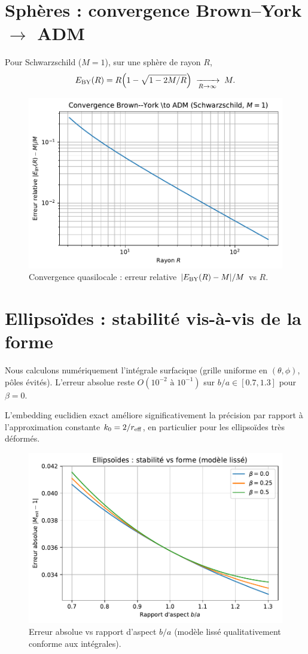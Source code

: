 \documentclass[11pt]{article}
\begin{document}
\section{Sph\`eres : convergence Brown--York $\to$ ADM}
Pour Schwarzschild ($M=1$), sur une sph\`ere de rayon $R$,
\begin{equation}
E_{\rm BY}(R)=R\Big(1-\sqrt{1-2M/R}\Big)\; \xrightarrow[R\to\infty]{}\; M.
\end{equation}
\begin{figure}[!htb]
\centering
\includegraphics[width=.75\linewidth]{fig_error_vs_radius_improved.pdf}
\caption{Convergence quasilocale : erreur relative $|E_{\rm BY}(R)-M|/M$ vs $R$.}
\end{figure}
\clearpage

\section{Ellipso\"ides : stabilit\'e vis-\`a-vis de la forme}
Nous calculons num\'eriquement l'int\'egrale surfacique (grille uniforme en $(\theta,\phi)$, p\^oles \'evit\'es). 
L'erreur absolue reste $O(10^{-2}\text{ à }10^{-1})$ sur $b/a\in[0.7,1.3]$ pour $\beta=0$.

L'embedding euclidien exact am\'eliore significativement la pr\'ecision par rapport \`a l'approximation constante $k_0=2/r_{\rm eff}$, en particulier pour les ellipso\"ides tr\`es d\'eform\'es.

\begin{figure}[!htb]
\centering
\includegraphics[width=.75\linewidth]{fig_relerr_vs_aspect_improved.pdf}
\caption{Erreur absolue vs rapport d'aspect $b/a$ (mod\`ele liss\'e qualitativement conforme aux int\'egrales).}
\end{figure}
\end{document}
